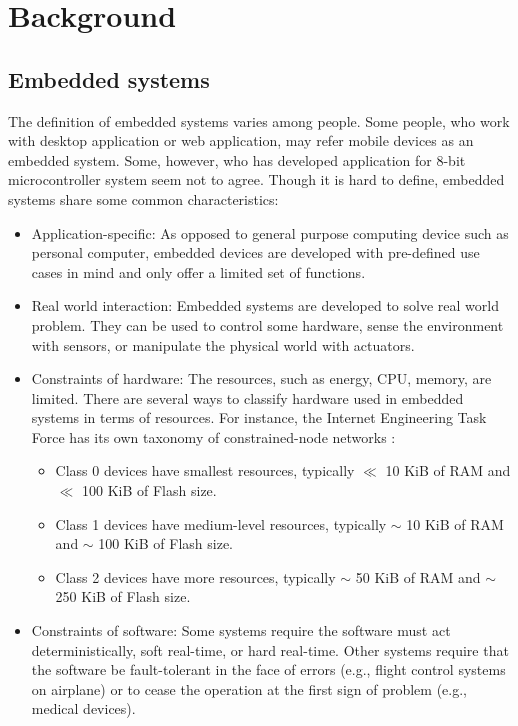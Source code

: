 \section{Background}
\subsection{Embedded systems}
\justify
The definition of embedded systems varies among people. Some people, who 
work with desktop application or web application, may refer mobile devices 
as an embedded system. Some, however, who has developed application for 
8-bit microcontroller system seem not to agree. Though it is hard to define, 
embedded systems share some common characteristics:
\begin{itemize}
    \item Application-specific: 
        As opposed to general purpose computing device such as personal 
        computer, embedded devices are developed with pre-defined use cases 
        in mind and only offer a limited set of functions.
    \item Real world interaction:
        Embedded systems are developed to solve real world problem. They can
        be used to control some hardware, sense the environment with sensors, 
        or manipulate the physical world with actuators.  
    \item Constraints of hardware: 
        The resources, such as energy, CPU, memory, are limited. There are
        several ways to classify hardware used in embedded systems in terms 
        of resources. For instance, the Internet Engineering Task Force has 
        its own taxonomy of constrained-node networks \cite{BEK14}: 
        \begin{itemize}
            \item Class 0 devices have smallest resources, typically 
                $\ll$ 10 KiB of RAM and $\ll$ 100 KiB of Flash size.
            \item Class 1 devices have medium-level resources, typically 
                $\sim$ 10 KiB of RAM and $\sim$ 100 KiB of Flash size.
            \item Class 2 devices have more resources, typically 
                $\sim$ 50 KiB of RAM and $\sim$ 250 KiB of Flash size. 
        \end{itemize}
    \item Constraints of software: 
        Some systems require the software must act deterministically, soft 
        real-time, or hard real-time. Other systems require that the software
        be fault-tolerant in the face of errors (e.g., flight control systems
        on airplane) or to cease the operation at the first sign of problem (e.g.,
        medical devices). \cite[~1]{White11} 
\end{itemize}
